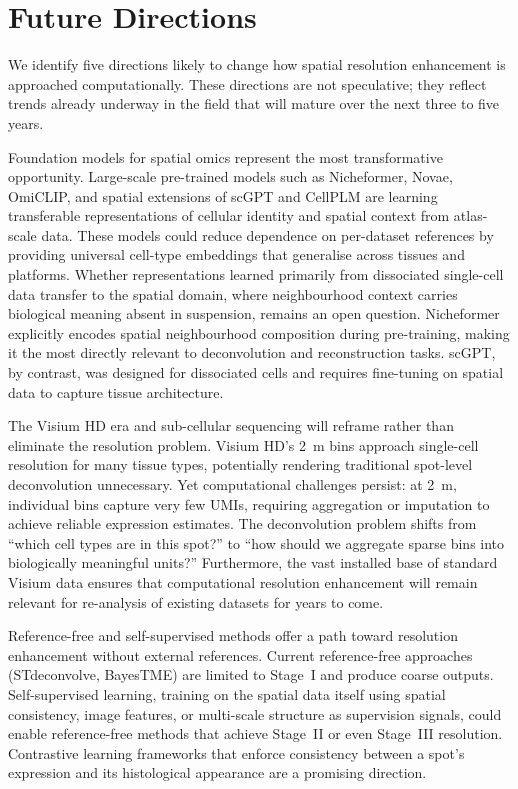 \section{Future Directions}
\label{sec:future}

We identify five directions likely to change how spatial resolution enhancement is approached computationally. These directions are not speculative; they reflect trends already underway in the field that will mature over the next three to five years.

Foundation models for spatial omics represent the most transformative opportunity. Large-scale pre-trained models such as Nicheformer, Novae, OmiCLIP, and spatial extensions of scGPT \citep{cui2024scgpt} and CellPLM are learning transferable representations of cellular identity and spatial context from atlas-scale data. These models could reduce dependence on per-dataset references by providing universal cell-type embeddings that generalise across tissues and platforms. Whether representations learned primarily from dissociated single-cell data transfer to the spatial domain, where neighbourhood context carries biological meaning absent in suspension, remains an open question. Nicheformer explicitly encodes spatial neighbourhood composition during pre-training, making it the most directly relevant to deconvolution and reconstruction tasks. scGPT, by contrast, was designed for dissociated cells and requires fine-tuning on spatial data to capture tissue architecture.

The Visium HD era and sub-cellular sequencing will reframe rather than eliminate the resolution problem. Visium HD's 2~\textmu m bins approach single-cell resolution for many tissue types, potentially rendering traditional spot-level deconvolution unnecessary. Yet computational challenges persist: at 2~\textmu m, individual bins capture very few UMIs, requiring aggregation or imputation to achieve reliable expression estimates. The deconvolution problem shifts from ``which cell types are in this spot?'' to ``how should we aggregate sparse bins into biologically meaningful units?'' Furthermore, the vast installed base of standard Visium data ensures that computational resolution enhancement will remain relevant for re-analysis of existing datasets for years to come.

Reference-free and self-supervised methods offer a path toward resolution enhancement without external references. Current reference-free approaches (STdeconvolve, BayesTME) are limited to Stage~I and produce coarse outputs. Self-supervised learning, training on the spatial data itself using spatial consistency, image features, or multi-scale structure as supervision signals, could enable reference-free methods that achieve Stage~II or even Stage~III resolution. Contrastive learning frameworks that enforce consistency between a spot's expression and its histological appearance are a promising direction.

